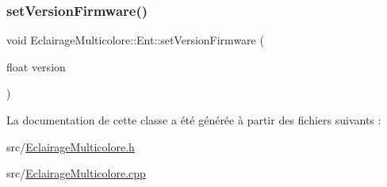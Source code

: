 \mbox{\label{classEclairageMulticolore_1_1Ent_a8d4b24f6283dad3d1eebd990c32500df}} 
\subsubsection{\texorpdfstring{set\+Version\+Firmware()}{setVersionFirmware()}}
{\footnotesize\ttfamily void Eclairage\+Multicolore\+::\+Ent\+::set\+Version\+Firmware (\begin{DoxyParamCaption}\item[{float}]{version }\end{DoxyParamCaption})}



La documentation de cette classe a été générée à partir des fichiers suivants \+:\begin{DoxyCompactItemize}
\item 
src/\hyperlink{EclairageMulticolore_8h}{Eclairage\+Multicolore.\+h}\item 
src/\hyperlink{EclairageMulticolore_8cpp}{Eclairage\+Multicolore.\+cpp}\end{DoxyCompactItemize}
